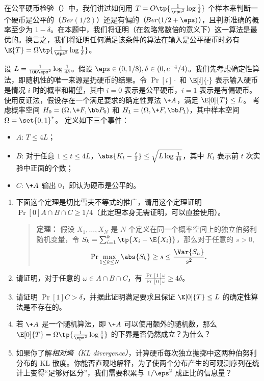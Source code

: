 \begin{problem}\label{prob:distinguish-cost}
在公平硬币检验（）中，我们讲过如何用 $T = O\tp{\frac{1}{\eps^2}\log\frac{1}{\delta}}$ 个样本来判断一个硬币是公平的（$\!{Ber}(1/2)$）还是有偏的（$\!{Ber}(1/2+\eps)$），且判断准确的概率至少为 $1-\delta$。在本题中，我们将证明（在忽略常数倍的意义下）这一算法是最优的。换言之，我们将证明任何满足该条件的算法在输入是公平硬币时必有 $\E{T} = \Omega\tp{\frac{1}{\eps^2}\log\frac{1}{\delta}}$。

设 $L = \frac{1}{100\eps^2}\log\frac{1}{4\delta}$。假设 $\eps \in (0, 1/8), \delta \in (0, e^{-4}/4)$。我们先考虑确定性算法，即随机性的唯一来源是扔硬币的结果。令 $\Pr[i]{\cdot}$ 和 $\E[i]{\cdot}$ 表示输入硬币是情况 $i$ 时的概率和期望，其中 $i=0$ 表示是公平硬币，$i=1$ 表示是有偏硬币。使用反证法，假设存在一个满足要求的确定性算法 $\+A$，满足 $\E[0]{T} \le L$。
考虑概率空间 $H_0 = (\Omega, \+F, \bb P_0)$ 和 $H_1 = (\Omega, \+F, \bb P_1)$，其中样本空间 $\Omega = \set{0, 1}^{*}$。
定义如下三个事件：
\begin{itemize}
    \item $A$: $T \le 4L$；
    \item $B$: 对于任意 $1 \le t \le 4L$，$\abs{K_t - \frac{t}{2}} \le \sqrt{L \log \frac{1}{4\delta}}$，其中 $K_t$ 表示前 $t$ 次实验中正面的个数；
    \item $C$: $\+A$ 输出 $0$，即认为硬币是公平的。
\end{itemize}

\begin{enumerate}
    \item 下面这个定理是切比雪夫不等式的推广，请用这个定理证明 $\Pr[0]{A \cap B \cap C} \ge 1/4$（此定理本身无需证明，可以直接使用）。
    \begin{quote}
        \textbf{定理：} 假设 $X_1,\dots,X_N$ 是 $N$ 个定义在同一个概率空间上的独立伯努利随机变量，令 $S_k=\sum_{i=1}^k \tp{X_i - \E{X_i}}$，那么对于任意的 $s>0$,
        \[
        \Pr{\max_{1\le k\le N}\abs{S_k}\ge s} \le \frac{\Var{S_n}}{s^2}.
        \]
    \end{quote}
    \item 请证明，对于任意的 $\omega \in A \cap B \cap C$，有 $\frac{\Pr[1]{\omega}}{\Pr[0]{\omega}} \ge 4\delta$。
    \item 请证明 $\Pr[1]{C} > \delta$，并据此证明满足要求且保证 $\E[0]{T} \le L$ 的确定性算法是不存在的。
    \item 若 $\+A$ 是一个随机算法，即 $\+A$ 可以使用额外的随机数，那么 $\E[0]{T} = \Omega\tp{\frac{1}{\eps^2}\log\frac{1}{\delta}}$ 的下界是否仍然成立？为什么？
    \item 如果你了解\emph{相对熵（KL divergence）}，计算硬币每次独立抛掷中这两种伯努利分布的 KL 散度。你能否直观地解释，为了使两个分布产生的可观测序列在统计上变得“足够好区分”，我们需要积累与 $1/\eps^2$ 成正比的信息量？
\end{enumerate}
\end{problem}
